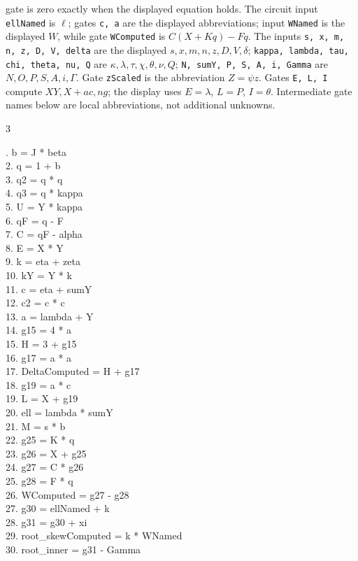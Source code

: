 \documentclass[10pt]{article}
\begin{document}
gate is zero exactly when the displayed equation holds. The circuit input
\texttt{ellNamed} is $\ell$; gates \texttt{c, a} are the displayed abbreviations; input \texttt{WNamed} is the
displayed $W$, while gate \texttt{WComputed} is $C(X+Kq)-Fq$. The inputs
\texttt{s, x, m, n, z, D, V, delta} are the displayed
$s,x,m,n,z,D,V,\delta$; \texttt{kappa, lambda, tau, chi, theta, nu, Q}
are $\kappa,\lambda,\tau,\chi,\theta,\nu,Q$; \texttt{N, sumY, P, S, A, i, Gamma}
are $N,O,P,S,A,i,\Gamma$. Gate \texttt{zScaled} is the abbreviation $Z=\psi z$. Gates \texttt{E, L, I} compute $XY,X+ac,ng$;
the display uses $E=\lambda$, $L=P$, $I=\theta$. Intermediate gate
names below are local abbreviations, not additional unknowns.
\begin{multicols}{3}
\raggedright\ttfamily\fontsize{6.2}{7.1}. b = J * beta\\
2. q = 1 + b\\
3. q2 = q * q\\
4. q3 = q * kappa\\
5. U = Y * kappa\\
6. qF = q - F\\
7. C = qF - alpha\\
8. E = X * Y\\
9. k = eta + zeta\\
10. kY = Y * k\\
11. c = eta + sumY\\
12. c2 = c * c\\
13. a = lambda + Y\\
14. g15 = 4 * a\\
15. H = 3 + g15\\
16. g17 = a * a\\
17. DeltaComputed = H + g17\\
18. g19 = a * c\\
19. L = X + g19\\
20. ell = lambda * sumY\\
21. M = s * b\\
22. g25 = K * q\\
23. g26 = X + g25\\
24. g27 = C * g26\\
25. g28 = F * q\\
26. WComputed = g27 - g28\\
27. g30 = ellNamed + k\\
28. g31 = g30 + xi\\
29. root\_skewComputed = k * WNamed\\
30. root\_inner = g31 - Gamma\\

\end{multicols}
\end{document}
